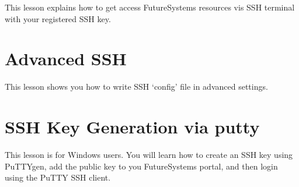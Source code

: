 This lesson explains how to get access FutureSystems resources vis SSH
terminal with your registered SSH key.


\section{Advanced SSH}

This lesson shows you how to write SSH `config' file in advanced
settings.


\section{SSH Key Generation via putty}

This lesson is for Windows users. You will learn how to create an SSH
key using PuTTYgen, add the public key to you FutureSystems portal,
and then login using the PuTTY SSH client.


\begin{comment}
\section{Creating VMs using Cloudmesh and running IPython}

This lesson explains how to log into FutureSystems and our customized
shell and menu options that will simplify management of the VMs for this
upcoming lessons.

Instruction is at:
\url{http://cloudmesh.github.io/introduction_to_cloud_computing/class/cm-mooc/cm-mooc.html}

\video{Python}{19:28}{Using FS - Creating VM using Cloudmesh and running IPython}{http://youtu.be/nbZbJxheLwc}
\end{comment}